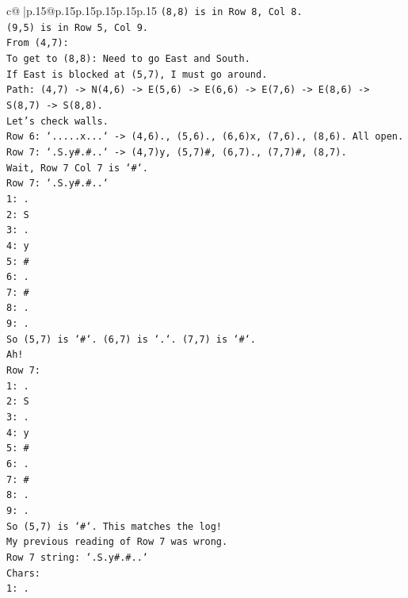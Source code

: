 \documentclass{article}
\begin{document}
{\begin{supertabular}{c@{$\;$}|p{.15\linewidth}@{}p{.15\linewidth}p{.15\linewidth}p{.15\linewidth}p{.15\linewidth}p{.15\linewidth}}
{{{\texttt{(8,8) is in Row 8, Col 8.} \\
\texttt{(9,5) is in Row 5, Col 9.} \\
\texttt{From (4,7):} \\
\texttt{To get to (8,8): Need to go East and South.} \\
\texttt{If East is blocked at (5,7), I must go around.} \\
\texttt{Path: (4,7) {-}> N(4,6) {-}> E(5,6) {-}> E(6,6) {-}> E(7,6) {-}> E(8,6) {-}> S(8,7) {-}> S(8,8).} \\
\texttt{Let's check walls.} \\
\texttt{Row 6: `.....x...` {-}> (4,6)., (5,6)., (6,6)x, (7,6)., (8,6). All open.} \\
\texttt{Row 7: `.S.y\#.\#..` {-}> (4,7)y, (5,7)\#, (6,7)., (7,7)\#, (8,7).} \\
\texttt{Wait, Row 7 Col 7 is `\#`.} \\
\texttt{Row 7: `.S.y\#.\#..`} \\
\texttt{1: .} \\
\texttt{2: S} \\
\texttt{3: .} \\
\texttt{4: y} \\
\texttt{5: \#} \\
\texttt{6: .} \\
\texttt{7: \#} \\
\texttt{8: .} \\
\texttt{9: .} \\
\texttt{So (5,7) is `\#`. (6,7) is `.`. (7,7) is `\#`.} \\
\texttt{Ah!} \\
\texttt{Row 7:} \\
\texttt{1: .} \\
\texttt{2: S} \\
\texttt{3: .} \\
\texttt{4: y} \\
\texttt{5: \#} \\
\texttt{6: .} \\
\texttt{7: \#} \\
\texttt{8: .} \\
\texttt{9: .} \\
\texttt{So (5,7) is `\#`. This matches the log!} \\
\texttt{My previous reading of Row 7 was wrong.} \\
\texttt{Row 7 string: `.S.y\#.\#..`} \\
\texttt{Chars:} \\
\texttt{1: .} \\
}}}
\end{supertabular}}
\end{document}
